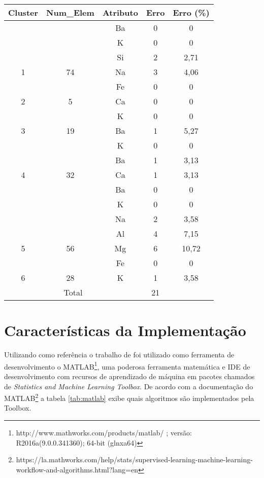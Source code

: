 \begin{apendicesenv}
\begin{table}[]
{{\begin{tabular}{|c|c|c|c|c|}
\hline
\rowcolor[HTML]{EFEFEF} 
\hline
Cluster             & Num\_Elem              & Atributo     & Erro & Erro (\%) \\ \hline
 &  & Ba & 0 & 0\\
 &  & K & 0 & 0\\
 &  & Si & 2 & 2,71\\
\multirow{-2}{*}{1} &   \multirow{-2}{*}{74}& Na & 3 & 4,06\\ \hline
  &  & Fe & 0 & 0\\
 \multirow{-2}{*}{2} &   \multirow{-2}{*}{5} & Ca & 0 & 0\\ \hline
  &  & K & 0 & 0\\
 \multirow{-2}{*}{3} &   \multirow{-2}{*}{19} & Ba & 1 & 5,27 \\ \hline
  &   & K & 0 & 0\\
 &  &  Ba & 1 & 3,13\\
\multirow{-3}{*}{4} &   \multirow{-3}{*}{32} & Ca & 1 & 3,13\\ \hline
 &  & Ba & 0 & 0\\
 &  & K & 0 & 0\\
 &  &  Na & 2 & 3,58\\
 &  & Al & 4 & 7,15\\
\multirow{-5}{*}{5} &   \multirow{-5}{*}{56}  & Mg & 6 & 10,72\\ \hline
  &  & Fe & 0 & 0\\
 \multirow{-2}{*}{6} &   \multirow{-2}{*}{28} & K & 1 & 3,58 \\ \hline
\multicolumn{3}{|c|}{Total}                             & 21   &\\ \hline
\end{tabular}
} %
} %
\end{table}


\chapter{Características da Implementação}
\label{apendice:2}
Utilizando como referência o  trabalho de  \cite{Lopes2016} foi utilizado como ferramenta de desenvolvimento o MATLAB\footnote{http://www.mathworks.com/products/matlab/ ; versão: R2016a(9.0.0.341360); 64-bit (glnxa64)}, uma poderosa ferramenta matemática e IDE de desenvolvimento com recursos de aprendizado de máquina em pacotes chamados de \textit{Statistics and Machine Learning Toolbox}. De acordo com a documentação do MATLAB\footnote{https://la.mathworks.com/help/stats/supervised-learning-machine-learning-workflow-and-algorithms.html?lang=en} a  tabela \ref{tab:matlab} exibe quais algoritmos são implementados pela Toolbox.




\end{apendicesenv}
